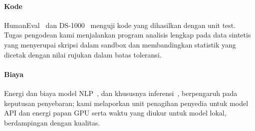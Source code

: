 \paragraph{Kode} HumanEval~\cite{chen2021codex} dan DS-1000~\cite{lai2023ds1000} menguji kode yang dihasilkan dengan unit test. Tugas pengodean kami menjalankan program analisis lengkap pada data sintetis yang menyerupai skripsi dalam sandbox dan membandingkan statistik yang dicetak dengan nilai rujukan dalam batas toleransi.

\paragraph{Biaya} Energi dan biaya model NLP~\cite{strubell2019energy}, dan khususnya inferensi~\cite{luccioni2024power}, berpengaruh pada keputusan penyebaran; kami melaporkan unit penagihan penyedia untuk model API dan energi papan GPU serta waktu yang diukur untuk model lokal, berdampingan dengan kualitas.
